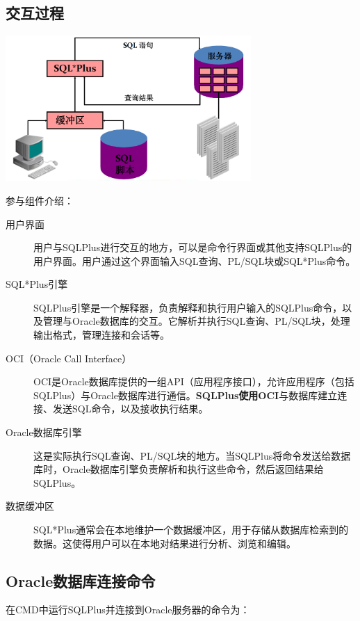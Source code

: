 \documentclass[11pt, a4paper, oneside, UTF8]{ctexbook}
\begin{document}
\subsection{交互过程}
\begin{center}
  \begin{minipage}{\textwidth}
    \center
    \includegraphics[width=0.7\textwidth]{picture/SQLPLUS交互.png}
    \captionsetup{hypcap=false}
    \label{fig:SQLPLUS交互}
  \end{minipage}
\end{center}
参与组件介绍：
\begin{description}
  \item[用户界面] 用户与SQLPlus进行交互的地方，可以是命令行界面或其他支持SQLPlus的用户界面。用户通过这个界面输入SQL查询、PL/SQL块或SQL*Plus命令。
  \item[SQL*Plus引擎] SQLPlus引擎是一个解释器，负责解释和执行用户输入的SQLPlus命令，以及管理与Oracle数据库的交互。它解析并执行SQL查询、PL/SQL块，处理输出格式，管理连接和会话等。
  \item[OCI（Oracle Call Interface）] OCI是Oracle数据库提供的一组API（应用程序接口），允许应用程序（包括SQLPlus）与Oracle数据库进行通信。\textbf{SQLPlus使用OCI}与数据库建立连接、发送SQL命令，以及接收执行结果。
  \item[Oracle数据库引擎] 这是实际执行SQL查询、PL/SQL块的地方。当SQLPlus将命令发送给数据库时，Oracle数据库引擎负责解析和执行这些命令，然后返回结果给SQLPlus。
  \item[数据缓冲区] SQL*Plus通常会在本地维护一个数据缓冲区，用于存储从数据库检索到的数据。这使得用户可以在本地对结果进行分析、浏览和编辑。
\end{description}
\subsection{Oracle数据库连接命令}
在CMD中运行SQLPlus并连接到Oracle服务器的命令为：
\end{document}
